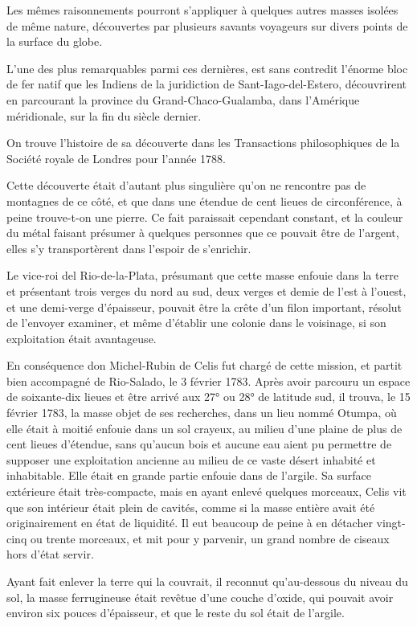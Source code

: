 \documentclass[a4paper, 12pt, oneside, french]{article}
\begin{document}
Les mêmes raisonnements pourront s'appliquer à quelques autres masses isolées de même nature, découvertes par plusieurs savants voyageurs sur divers points de la surface du globe.

L'une des plus remarquables parmi ces dernières, est sans contredit l'énorme bloc de fer natif que les Indiens de la juridiction de Sant-Iago-del-Estero, découvrirent en parcourant la province du Grand-Chaco-Gualamba, dans l'Amérique méridionale, sur la fin du siècle dernier.

On trouve l'histoire de sa découverte dans les Transactions philosophiques de la Société royale de Londres pour l'année 1788.

Cette découverte était d'autant plus singulière qu'on ne rencontre pas de montagnes de ce côté, et que dans une étendue de cent lieues de circonférence, à peine trouve-t-on une pierre. Ce fait paraissait cependant constant, et la couleur du métal faisant présumer à quelques personnes que ce pouvait être de l'argent, elles s'y transportèrent dans l'espoir de s'enrichir.

Le vice-roi del Rio-de-la-Plata, présumant que cette masse enfouie dans la terre et présentant trois verges du nord au sud, deux verges et demie de l'est à l'ouest, et une demi-verge d'épaisseur, pouvait être la crête d'un filon important, résolut de l'envoyer examiner, et même d'établir une colonie dans le voisinage, si son exploitation était avantageuse.

En conséquence don Michel-Rubin de Celis fut chargé de cette mission, et partit bien accompagné de Rio-Salado, le 3 février 1783. Après avoir parcouru un espace de soixante-dix lieues et être arrivé aux 27° ou 28° de latitude sud, il trouva, le 15 février 1783, la masse objet de ses recherches, dans un lieu nommé Otumpa, où elle était à moitié enfouie dans un sol crayeux, au milieu d'une plaine de plus de cent lieues d'étendue, sans qu'aucun bois et aucune eau aient pu permettre de supposer une exploitation ancienne au milieu de ce vaste désert inhabité et inhabitable. Elle était en grande partie enfouie dans de l'argile. Sa surface extérieure était très-compacte, mais en ayant enlevé quelques morceaux, Celis vit que son intérieur était plein de cavités, comme si la masse entière avait été originairement en état de liquidité. Il eut beaucoup de peine à en détacher vingt-cinq ou trente morceaux, et mit pour y parvenir, un grand nombre de ciseaux hors d'état servir.

Ayant fait enlever la terre qui la couvrait, il reconnut qu'au-dessous du niveau du sol, la masse ferrugineuse était revêtue d'une couche d'oxide, qui pouvait avoir environ six pouces d'épaisseur, et que le reste du sol était de l'argile.
\end{document}
